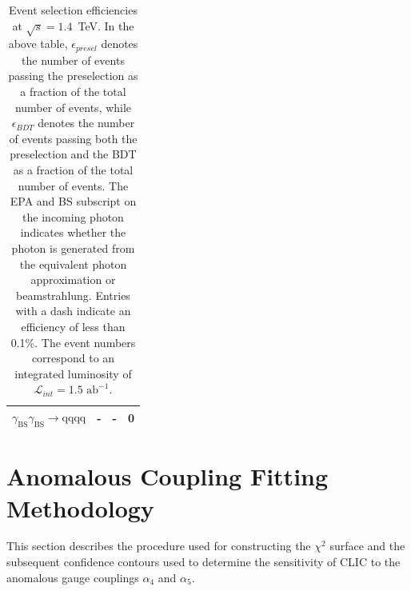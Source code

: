 \begin{table}[h!]
\begin{tabular}{ l r r r }
$\gamma_{\text{BS}}\gamma_{\text{BS}} \rightarrow \text{qqqq}$ & - & - & 0 \\
\hline
\end{tabular}
\caption[Event selection efficiencies at $\sqrt{s}=1.4$~TeV.  In the above table, $\epsilon_{presel}$ denotes the number of events passing the preselection as a fraction of the total number of events, while $\epsilon_{BDT}$ denotes the number of events passing both the preselection and the BDT as a fraction of the total number of events.  The EPA and BS subscript on the incoming photon indicates whether the photon is generated from the equivalent photon approximation or beamstrahlung.  Entries with a dash indicate an efficiency of less than 0.1\%.  The event numbers correspond to an integrated luminosity of $\mathcal{L}_{int} = 1.5\text{ ab}^{-1}$.]{Event selection efficiencies at $\sqrt{s}=1.4$~TeV.  In the above table, $\epsilon_{presel}$ denotes the number of events passing the preselection as a fraction of the total number of events, while $\epsilon_{BDT}$ denotes the number of events passing both the preselection and the BDT as a fraction of the total number of events.  The EPA and BS subscript on the incoming photon indicates whether the photon is generated from the equivalent photon approximation or beamstrahlung.  Entries with a dash indicate an efficiency of less than 0.1\%.  The event numbers correspond to an integrated luminosity of $\mathcal{L}_{int} = 1.5\text{ ab}^{-1}$.}
\label{table:selectionsummary1400GeV}
\end{table}


\section{Anomalous Coupling Fitting Methodology}
\label{sec:fitting}
This section describes the procedure used for constructing the $\chi^{2}$ surface and the subsequent confidence contours used to determine the sensitivity of CLIC to the anomalous gauge couplings $\alpha_{4}$ and $\alpha_{5}$.


